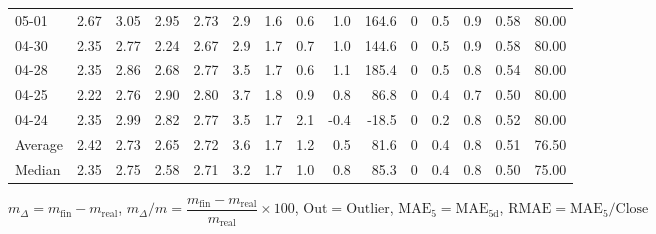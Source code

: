\begin{threeparttable}
{\begin{tabular}{lrrrrrrrrrrrrrr}
  05-01 &          2.67 &          3.05 &          2.95 &        2.73 &                 2.9 &                1.6 &                 0.6 &        1.0 &        164.6 &              0 &                 0.5 &              0.9 &            0.58 &                  80.00 \\
  04-30 &          2.35 &          2.77 &          2.24 &        2.67 &                 2.9 &                1.7 &                 0.7 &        1.0 &        144.6 &              0 &                 0.5 &              0.9 &            0.58 &                  80.00 \\
  04-28 &          2.35 &          2.86 &          2.68 &        2.77 &                 3.5 &                1.7 &                 0.6 &        1.1 &        185.4 &              0 &                 0.5 &              0.8 &            0.54 &                  80.00 \\
  04-25 &          2.22 &          2.76 &          2.90 &        2.80 &                 3.7 &                1.8 &                 0.9 &        0.8 &         86.8 &              0 &                 0.4 &              0.7 &            0.50 &                  80.00 \\
  04-24 &          2.35 &          2.99 &          2.82 &        2.77 &                 3.5 &                1.7 &                 2.1 &       -0.4 &        -18.5 &              0 &                 0.2 &              0.8 &            0.52 &                  80.00 \\
Average &          2.42 &          2.73 &          2.65 &        2.72 &                 3.6 &                1.7 &                 1.2 &        0.5 &         81.6 &              0 &                 0.4 &              0.8 &            0.51 &                  76.50 \\
 Median &          2.35 &          2.75 &          2.58 &        2.71 &                 3.2 &                1.7 &                 1.0 &        0.8 &         85.3 &              0 &                 0.4 &              0.8 &            0.50 &                  75.00 \\
\bottomrule
\end{tabular}
}
\begin{tablenotes}\footnotesize
\item $m_\Delta=m_{\text{fin}}-m_{\text{real}}$,
$m_\Delta/m=\dfrac{m_{\text{fin}}-m_{\text{real}}}{m_{\text{real}}}\times100$,
$\mathrm{Out}=\text{Outlier}$,
$\mathrm{MAE}_5=\mathrm{MAE}_{5\text{d}}$,
$\mathrm{RMAE}=\mathrm{MAE}_5/\text{Close}$
\end{tablenotes}
\end{threeparttable}
\endgroup

